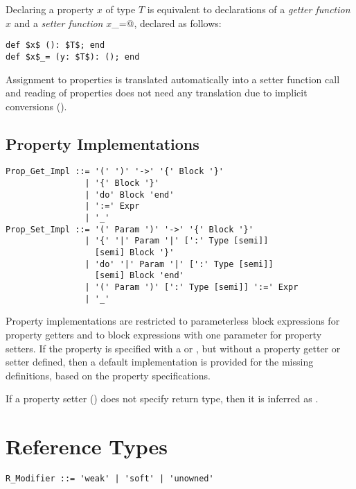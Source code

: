 Declaring a property $x$ of type $T$ is equivalent to declarations of a {\em getter function} $x$ and a {\em setter function} \lstinline@$x$_=@, declared as follows:

\begin{lstlisting}
def $x$ (): $T$; end
def $x$_= (y: $T$): (); end
\end{lstlisting}

Assignment to properties is translated automatically into a setter function call and reading of properties does not need any translation due to implicit conversions (). 






\subsection{Property Implementations}
\label{sec:property-impl}

\begin{lstlisting}
Prop_Get_Impl ::= '(' ')' '->' '{' Block '}'
                | '{' Block '}'
                | 'do' Block 'end'
                | ':=' Expr
                | '_'
Prop_Set_Impl ::= '(' Param ')' '->' '{' Block '}'
                | '{' '|' Param '|' [':' Type [semi]] 
                  [semi] Block '}'
                | 'do' '|' Param '|' [':' Type [semi]] 
                  [semi] Block 'end' 
                | '(' Param ')' [':' Type [semi]] ':=' Expr
                | '_'
\end{lstlisting}

Property implementations are restricted to parameterless block expressions for property getters and to block expressions with one parameter for property setters. If the property is specified with a  or , but without a property getter or setter defined, then a default implementation is provided for the missing definitions, based on the property specifications. 

If a property setter () does not specify return type, then it is inferred as . 





\section{Reference Types}
\label{sec:ref-types}

\syntax\begin{lstlisting}
R_Modifier ::= 'weak' | 'soft' | 'unowned'
\end{lstlisting}

